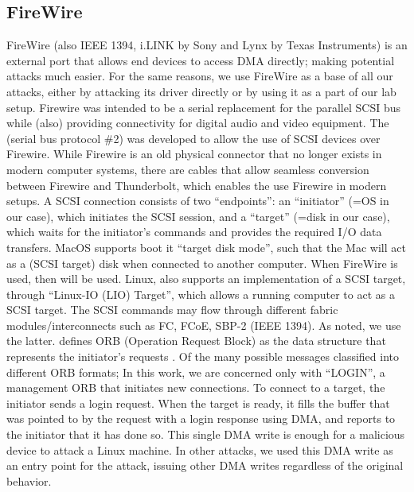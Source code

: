 \subsection{FireWire}
 FireWire (also IEEE 1394, i.LINK  by Sony and Lynx by Texas Instruments) is an external port that allows end devices to access DMA directly; making potential attacks much easier\cite{Fin14}. For the same reasons, we use FireWire as a base of all our attacks, either by attacking its driver directly or by using it as a part of our lab setup. Firewire was intended  to be a serial replacement for the parallel SCSI bus while (also) providing connectivity for digital audio and video equipment. The \spb (serial bus protocol \#2) was developed to allow the use of SCSI devices over Firewire. While Firewire is an old physical connector that no longer exists in modern computer systems, there are cables that allow seamless conversion between Firewire and Thunderbolt, which enables the use Firewire in modern setups. 
 \newline A SCSI connection consists of two “endpoints”: an “initiator” (=OS in our case), which initiates the SCSI session, and a “target” (=disk in our case), which waits for the initiator’s commands and provides the required I/O data transfers. MacOS supports boot it “target disk mode”, such that the Mac will act as a (SCSI target) disk when connected to another computer. When FireWire is used, then \spb will be used. Linux, also supports an implementation of a SCSI target, through “Linux-IO (LIO) Target”, which allows a running computer to act as a SCSI target. The SCSI commands may flow through different fabric modules/interconnects such as FC, FCoE, SBP-2 (IEEE 1394). As noted, we use the latter. \spb defines ORB (Operation Request Block) as the data structure that represents the initiator’s requests \cite{Joh98}. Of the many possible messages classified into different ORB formats; In this work, we are concerned only with “LOGIN”, a management ORB that initiates new connections. To connect to a target, the initiator sends a login request. When the target is ready, it fills the buffer that was pointed to by the request with a login response using DMA, and reports to the initiator that it has done so. This single DMA write is enough for a malicious device to attack a Linux machine. In other attacks, we used this DMA write as an entry point for the attack, issuing other DMA writes regardless of the original behavior.
